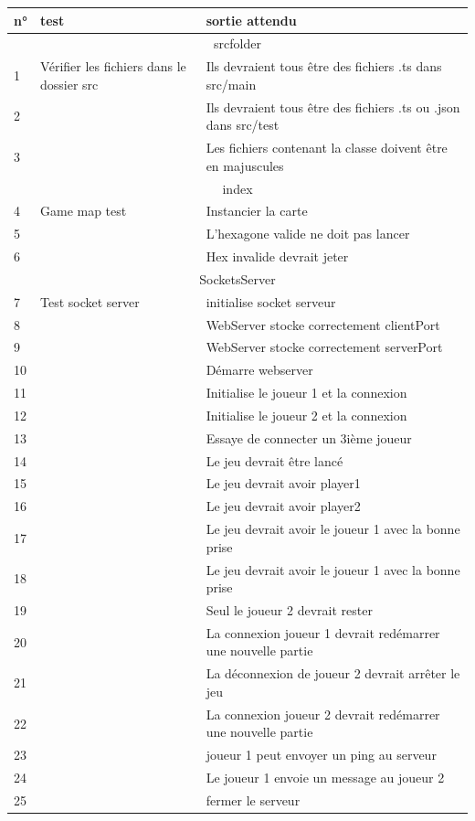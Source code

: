 \begin{center}
   \begin{tabular}{|l|l|l|}
  \hline
  
  n° & test & sortie attendu \\ \hline
  \multicolumn{3}{|c|}{srcfolder} \\
  \hline
  1 & Vérifier les fichiers dans le dossier src & Ils devraient tous être des fichiers .ts dans src/main\\  
  2 && Ils devraient tous être des fichiers .ts  ou  .json dans src/test \\
  3 && Les fichiers contenant la classe doivent être en majuscules \\
  \hline
  \multicolumn{3}{|c|}{index} \\
  \hline
  4 & Game map test & Instancier la carte\\
  5 && L'hexagone valide ne doit pas lancer \\
  6 && Hex invalide devrait jeter \\
  \hline
  \multicolumn{3}{|c|}{SocketsServer} \\
  \hline
  7 & Test socket server & initialise socket serveur\\
  8 && WebServer stocke correctement clientPort\\
  9 && WebServer stocke correctement serverPort\\
  10 && Démarre webserver\\
  11 && Initialise le joueur 1 et la connexion\\
  12 && Initialise le joueur 2 et la connexion \\
  13 && Essaye de connecter un 3ième joueur\\
  14 && Le jeu devrait être lancé \\
  15 && Le jeu devrait avoir player1\\
  16 && Le jeu devrait avoir player2\\
  17 && Le jeu devrait avoir le joueur 1 avec la bonne prise\\
  18 && Le jeu devrait avoir le joueur 1 avec la bonne prise\\
  19 && Seul le joueur 2 devrait rester \\
  20 && La connexion joueur 1 devrait redémarrer une nouvelle partie\\
  21 && La déconnexion de joueur 2 devrait arrêter le jeu\\
  22 && La connexion joueur 2 devrait redémarrer une nouvelle partie\\
  23 && joueur 1 peut envoyer un ping au serveur\\
  24 && Le joueur 1 envoie un message au joueur 2\\
  25 && fermer le serveur\\
  

\end{tabular}
\end{center}
